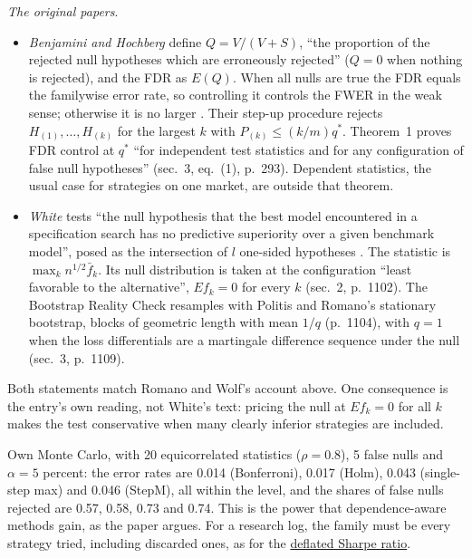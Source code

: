 \begin{qfmethod}
\emph{The original papers}.
\begin{itemize}
\item \emph{Benjamini and Hochberg} define $Q=V/(V+S)$, ``the proportion of the rejected null hypotheses which are erroneously rejected'' ($Q=0$ when nothing is rejected), and the FDR as $E(Q)$. When all nulls are true the FDR equals the familywise error rate, so controlling it controls the FWER in the weak sense; otherwise it is no larger \citep[sec.~2.1, p.~291]{wide-benjamini-hochberg}. Their step-up procedure rejects $H_{(1)},\dots,H_{(k)}$ for the largest $k$ with $P_{(k)}\le(k/m)q^*$. Theorem~1 proves FDR control at $q^*$ ``for independent test statistics and for any configuration of false null hypotheses'' (sec.~3, eq.~(1), p.~293). Dependent statistics, the usual case for strategies on one market, are outside that theorem.
\item \emph{White} tests ``the null hypothesis that the best model encountered in a specification search has no predictive superiority over a given benchmark model'', posed as the intersection of $l$ one-sided hypotheses \citep[abstract and sec.~1, pp.~1097--1098]{catalogue-0731}. The statistic is $\max_k n^{1/2}\bar f_k$. Its null distribution is taken at the configuration ``least favorable to the alternative'', $E f_k=0$ for every $k$ (sec.~2, p.~1102). The Bootstrap Reality Check resamples with Politis and Romano's stationary bootstrap, blocks of geometric length with mean $1/q$ (p.~1104), with $q=1$ when the loss differentials are a martingale difference sequence under the null (sec.~3, p.~1109).
\end{itemize}
Both statements match Romano and Wolf's account above. One consequence is the entry's own reading, not White's text: pricing the null at $E f_k=0$ for all $k$ makes the test conservative when many clearly inferior strategies are included.

 Own Monte Carlo, with 20 equicorrelated statistics ($\rho=0.8$), 5 false nulls and $\alpha=5$ percent: the error rates are 0.014 (Bonferroni), 0.017 (Holm), 0.043 (single-step max) and 0.046 (StepM), all within the level, and the shares of false nulls rejected are 0.57, 0.58, 0.73 and 0.74. This is the power that dependence-aware methods gain, as the paper argues. For a research log, the family must be every strategy tried, including discarded ones, as for the \hyperref[meth:deflated-sharpe-ratio]{deflated Sharpe ratio}.


\end{qfmethod}
